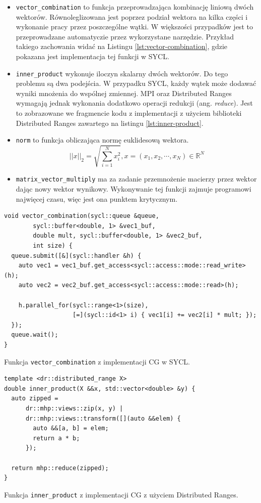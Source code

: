 \documentclass[a4paper,12pt]{book} %
\begin{document}
\begin{itemize}
\item \texttt{vector\_combination} to funkcja przeprowadzająca kombinację liniową dwóch wektorów. Równoleglizowana jest poprzez podział wektora na kilka części i wykonanie pracy przez poszczególne wątki. W większości przypadków jest to przeprowadzane automatyczie przez wykorzystane narzędzie. Przykład takiego zachowania widać na Listingu \ref{lst:vector-combination}, gdzie pokazana jest implementacja tej funkcji w SYCL.
\item \texttt{inner\_product} wykonuje iloczyn skalarny dwóch wektorów. Do tego problemu są dwa podejścia. W przypadku SYCL, każdy wątek może dodawać wyniki mnożenia do wspólnej zmiennej. MPI oraz Distributed Ranges wymagają jednak wykonania dodatkowo operacji redukcji (ang. \emph{reduce}). Jest to zobrazowane we fragmencie kodu z implementacji z użyciem biblioteki Distributed Ranges zawartego na listingu \ref{lst:inner-product}.
\item \texttt{norm} to funkcja obliczająca normę euklidesową wektora. $$||x||_2 = \sqrt{\sum_{i=1}^Nx^2_i}, x = (x_1,x_2,\cdots,x_N) \in \mathbb{R}^N$$
\item \texttt{matrix\_vector\_multiply} ma za zadanie przemnożenie macierzy przez wektor dając nowy wektor wynikowy. Wykonywanie tej funkcji zajmuje programowi najwięcej czasu, więc jest ona punktem krytycznym. 
\end{itemize}

\begin{lstfloat}
\lstset{language=C++}
\begin{lstlisting}[frame=single]
void vector_combination(sycl::queue &queue, 
		sycl::buffer<double, 1> &vec1_buf,
        double mult, sycl::buffer<double, 1> &vec2_buf,
        int size) {
  queue.submit([&](sycl::handler &h) {
    auto vec1 = vec1_buf.get_access<sycl::access::mode::read_write>(h);
    auto vec2 = vec2_buf.get_access<sycl::access::mode::read>(h);

    h.parallel_for(sycl::range<1>(size),
                   [=](sycl::id<1> i) { vec1[i] += vec2[i] * mult; });
  });
  queue.wait();
}
\end{lstlisting}
\caption{Funkcja \texttt{vector\_combination} z implementacji CG w SYCL.}
\label{lst:vector-combination}
\end{lstfloat}

\begin{lstfloat}
\lstset{language=C++}
\begin{lstlisting}[frame=single]
template <dr::distributed_range X>
double inner_product(X &&x, std::vector<double> &y) {
  auto zipped =
      dr::mhp::views::zip(x, y) | 
      dr::mhp::views::transform([](auto &&elem) {
        auto &&[a, b] = elem;
        return a * b;
      });

  return mhp::reduce(zipped);
}
\end{lstlisting}
\caption{Funkcja \texttt{inner\_product} z implementacji CG z użyciem Distributed Ranges.}
\label{lst:inner-product}
\end{lstfloat}
\end{document}
